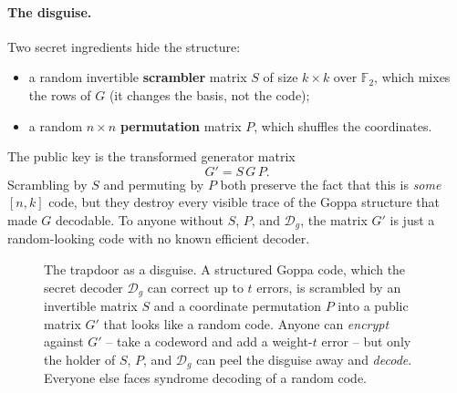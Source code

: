 \paragraph{The disguise.}
Two secret ingredients hide the structure:
\begin{itemize}
  \item a random invertible \textbf{scrambler} matrix $S$ of size $k \times k$ over $\mathbb{F}_2$, which mixes the rows of $G$ (it changes the basis, not the code);
  \item a random $n \times n$ \textbf{permutation} matrix $P$, which shuffles the coordinates.
\end{itemize}
The public key is the transformed generator matrix
\[
G' = S\,G\,P .
\]
Scrambling by $S$ and permuting by $P$ both preserve the fact that this is \emph{some} $[n,k]$ code, but they destroy every visible trace of the Goppa structure that made $G$ decodable. To anyone without $S$, $P$, and $\mathcal{D}_g$, the matrix $G'$ is just a random-looking code with no known efficient decoder.

\begin{figure}[H]
\centering
{}
\caption{The trapdoor as a disguise. A structured Goppa code, which the secret decoder $\mathcal{D}_g$ can correct up to $t$ errors, is scrambled by an invertible matrix $S$ and a coordinate permutation $P$ into a public matrix $G'$ that looks like a random code. Anyone can \emph{encrypt} against $G'$ -- take a codeword and add a weight-$t$ error -- but only the holder of $S$, $P$, and $\mathcal{D}_g$ can peel the disguise away and \emph{decode}. Everyone else faces syndrome decoding of a random code.}
\label{fig:mceliece-disguise}
\end{figure}

